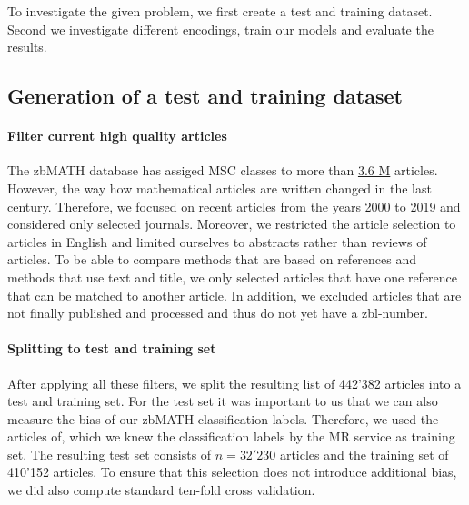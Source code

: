 To investigate the given problem, we first create a test and training dataset.
Second we investigate different encodings, train our models and evaluate the results.
\subsection{Generation of a test and training dataset}
\paragraph{Filter current high quality articles}
The zbMATH database has assiged MSC classes to more than
\href{https://zbmath.org/?q=cc%3A*}%
{3.6 M} articles.
However, the way how mathematical articles are written changed in the last century.
Therefore, we focused on recent articles from the years 2000 to 2019 and considered only selected journals.
Moreover, we restricted the article selection to articles in English and limited ourselves to abstracts rather than reviews of articles.
To be able to compare methods that are based on references and methods that use text and title, we only selected articles that have one reference that
can be matched to another article.
In addition, we excluded articles that are not finally published and processed and thus do not yet have a zbl-number.
\paragraph{Splitting to test and training set}
After applying all these filters, we split the resulting list of 442'382 articles into a test and training set.
For the test set it was important to us that we can also measure the bias of our zbMATH classification labels.
Therefore, we used the articles of, which we knew the classification labels by the MR service as training set.
The resulting test set consists of $n=32'230$ articles and the training set of 410'152 articles.
To ensure that this selection does not introduce additional bias, we did also compute standard ten-fold cross validation.
